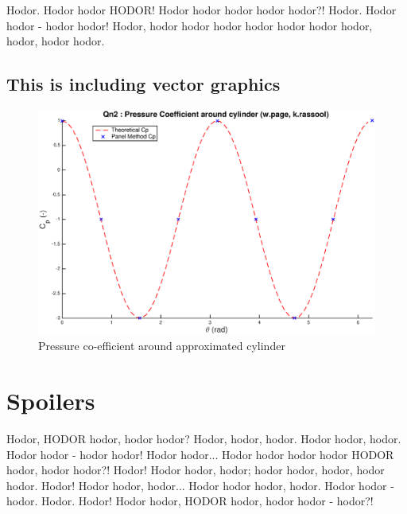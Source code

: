 Hodor. Hodor hodor HODOR! Hodor hodor hodor hodor hodor?! Hodor. Hodor hodor - hodor hodor! Hodor, hodor hodor hodor hodor hodor hodor hodor, hodor, hodor hodor.


%
\subsection{This is including vector graphics}

\begin{figure}[H]
    \centering
    \includegraphics[width=\textwidth]{i/source_panels/qn2_cp.eps}
    \vspace{-3em}
    \caption{Pressure co-efficient around approximated cylinder}
    \label{fig:cp8}
\end{figure}


\section{Spoilers}

Hodor, HODOR hodor, hodor hodor? Hodor, hodor, hodor. Hodor hodor, hodor. Hodor hodor - hodor hodor! Hodor hodor... Hodor hodor hodor hodor HODOR hodor, hodor hodor?! Hodor! Hodor hodor, hodor; hodor hodor, hodor, hodor hodor. Hodor! Hodor hodor, hodor... Hodor hodor hodor, hodor. Hodor hodor - hodor. Hodor. Hodor! Hodor hodor, HODOR hodor, hodor hodor - hodor?! 
